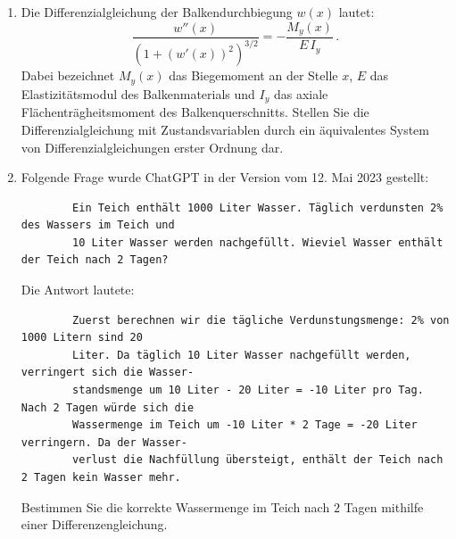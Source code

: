 \begin{Aufgabe}[10]
\begin{enumerate}
	\item
	Die Differenzialgleichung der Balkendurchbiegung $w(x)$ lautet:
	\[
		\frac{w''(x)}{({1 + (w'(x))^2})^{3/2}} = -\frac{M_y(x)}{E \, I_y} \, .
	\]
	Dabei bezeichnet $M_y(x)$ das Biegemoment an der Stelle $x$, $E$ das Elastizitätsmodul des Balkenmaterials und $I_y$ das axiale Flächenträgheitsmoment des Balkenquerschnitts.
	Stellen Sie die Differenzialgleichung mit Zustandsvariablen durch ein äquivalentes System von Differenzialgleichungen erster Ordnung dar.

	
\pagebreak

	\item
		Folgende Frage wurde ChatGPT in der Version vom 12. Mai 2023 gestellt: 
		
		\begin{verbatim}
		Ein Teich enthält 1000 Liter Wasser. Täglich verdunsten 2% des Wassers im Teich und
		10 Liter Wasser werden nachgefüllt. Wieviel Wasser enthält der Teich nach 2 Tagen?
		\end{verbatim}
		
		Die Antwort lautete:
		
		\begin{verbatim}
		Zuerst berechnen wir die tägliche Verdunstungsmenge: 2% von 1000 Litern sind 20
		Liter. Da täglich 10 Liter Wasser nachgefüllt werden, verringert sich die Wasser-
		standsmenge um 10 Liter - 20 Liter = -10 Liter pro Tag. Nach 2 Tagen würde sich die
		Wassermenge im Teich um -10 Liter * 2 Tage = -20 Liter verringern. Da der Wasser-
		verlust die Nachfüllung übersteigt, enthält der Teich nach 2 Tagen kein Wasser mehr.
		\end{verbatim}
		
		Bestimmen Sie die korrekte Wassermenge im Teich nach $2$ Tagen mithilfe einer Differenzengleichung.
		
		

\end{enumerate}
\end{Aufgabe}
